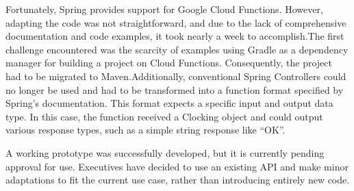 Fortunately, Spring provides support for Google Cloud Functions. However, adapting the code was 
not straightforward, and due to the lack of comprehensive documentation and code examples, it took 
nearly a week to accomplish.The first challenge encountered was the scarcity of examples using 
Gradle as a dependency manager for building a project on Cloud Functions. Consequently, the 
project had to be migrated to Maven.Additionally, conventional Spring Controllers could no longer 
be used and had to be transformed into a function format specified by Spring's documentation. This 
format expects a specific input and output data type. In this case, the function received a 
Clocking object and could output various response types, such as a simple string response like 
``OK''.

A working prototype was successfully developed, but it is currently pending approval for use. 
Executives have decided to use an existing API and make minor adaptations to fit the current use 
case, rather than introducing entirely new code.
